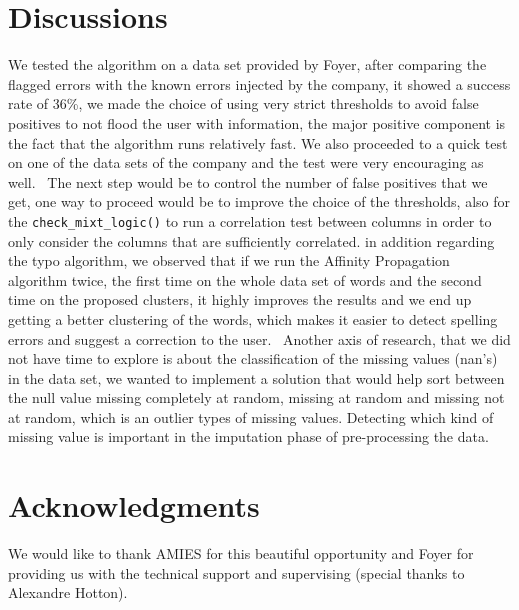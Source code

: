 \documentclass{article}
\begin{document}
\section{Discussions} %
\label{sec:Discussions}
We tested the algorithm on a data set provided by Foyer, after comparing the flagged errors with the known errors injected by the company, it showed a success rate of 36\%, we made the choice of using very strict thresholds to avoid false positives to not flood the user with information, the major positive component is the fact that the algorithm runs relatively fast. We also proceeded to a quick test on one of the data sets of the company and the test were very encouraging as well. \
The next step would be to control the number of false positives that we get, one way to proceed would be to improve the choice of the thresholds, also for the \texttt{check\_mixt\_logic()} to run a correlation test between columns in order to only consider the columns that are sufficiently correlated.
in addition regarding the typo algorithm, we observed that if we run the Affinity Propagation algorithm twice, the first time on the whole data set of words and the second time on the proposed clusters, it highly improves the results and we end up getting a better clustering of the words, which makes it easier to detect spelling errors and suggest a correction to the user. \
Another axis of research, that we did not have time to explore is about the classification of the missing values (nan's) in the data set, we wanted to implement a solution that would help sort between the null value  missing completely at random, missing at random and missing not at random, which is an outlier types of missing values. Detecting which kind of missing value is important in the imputation phase of pre-processing the data.

\section*{Acknowledgments} %
\label{sec:Acknowledgments}
We would like to thank AMIES for this beautiful opportunity and Foyer for providing us with the technical support and supervising (special thanks to Alexandre Hotton).


\end{document}
